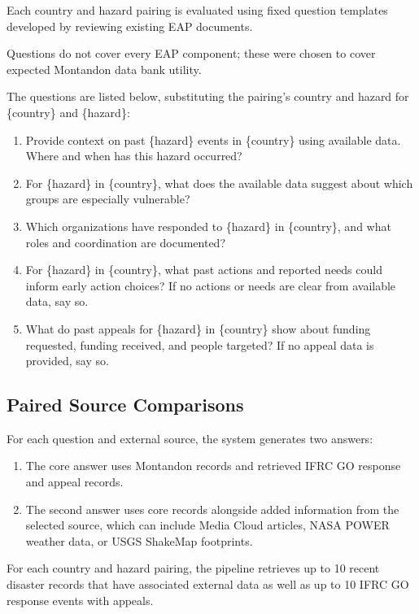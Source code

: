 \documentclass[journal]{IEEEtran}
\begin{document}
Each country and hazard pairing is evaluated using fixed question templates
developed by reviewing existing EAP documents.

Questions do not cover every EAP component; these were chosen to cover
expected Montandon data bank utility.

The questions are listed below, substituting the pairing's country and hazard
for \{country\} and \{hazard\}:

\begin{enumerate}
    \item Provide context on past \{hazard\} events in \{country\}
    using available data. Where and when has this hazard occurred?
    \item For \{hazard\} in \{country\}, what does the available
    data suggest about which groups are especially vulnerable?
    \item Which organizations have responded to \{hazard\} in
    \{country\}, and what roles and coordination are documented?
    \item For \{hazard\} in \{country\}, what past actions and
    reported needs could inform early action choices? If no actions
    or needs are clear from available data, say so.
    \item What do past appeals for \{hazard\} in \{country\} show
    about funding requested, funding received, and people targeted?
    If no appeal data is provided, say so.
\end{enumerate}

\subsection{Paired Source Comparisons}

For each question and external source, the system generates two
answers:
\begin{enumerate}
    \item The core answer uses Montandon records and retrieved
    IFRC GO response and appeal records.
    \item The second answer uses core records alongside added
    information from the selected source, which can include Media
    Cloud articles, NASA POWER weather data, or USGS ShakeMap
    footprints.
\end{enumerate}

For each country and hazard pairing, the pipeline retrieves up to 10 recent disaster records
that have associated external data as well as up to 10 IFRC GO response events with appeals.
\end{document}
